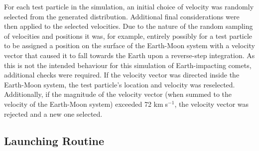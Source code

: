 


For each test particle in the simulation, an initial choice of velocity was randomly selected from the generated distribution. Additional final considerations were then applied to the selected velocities. Due to the nature of the random sampling of velocities and positions it was, for example, entirely possibly for a test particle to be assigned a position on the surface of the Earth-Moon system with a velocity vector that caused it to fall towards the Earth upon a reverse-step integration. As this is not the intended behaviour for this simulation of Earth-impacting comets, additional checks were required. If the velocity vector was directed inside the Earth-Moon system, the test particle's location and velocity was reselected. Additionally, if the magnitude of the velocity vector (when summed to the velocity of the Earth-Moon system) exceeded 72 km$\;$s$^{-1}$, the velocity vector was rejected and a new one selected.

\subsection{Launching Routine}

